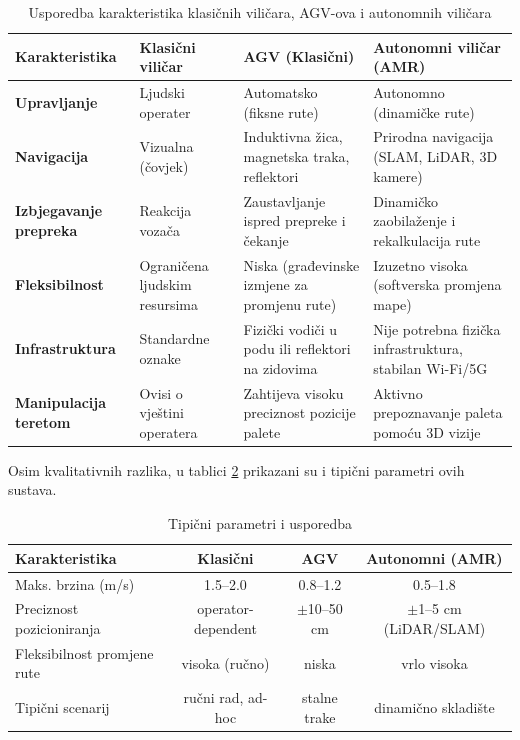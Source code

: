 \begin{table}[h]
\centering
\caption{Usporedba karakteristika klasičnih viličara, AGV-ova i autonomnih viličara}
\label{tab:usporedba}
\begin{tabularx}{\textwidth}{|l|X|X|X|}
\hline
\textbf{Karakteristika} & \textbf{Klasični viličar} & \textbf{AGV (Klasični)} & \textbf{Autonomni viličar (AMR)} \\ \hline
\textbf{Upravljanje} & Ljudski operater & Automatsko (fiksne rute) & Autonomno (dinamičke rute) \\ \hline
\textbf{Navigacija} & Vizualna (čovjek) & Induktivna žica, magnetska traka, reflektori & Prirodna navigacija (SLAM, LiDAR, 3D kamere) \\ \hline
\textbf{Izbjegavanje prepreka} & Reakcija vozača & Zaustavljanje ispred prepreke i čekanje & Dinamičko zaobilaženje i rekalkulacija rute \\ \hline
\textbf{Fleksibilnost} & Ograničena ljudskim resursima & Niska (građevinske izmjene za promjenu rute) & Izuzetno visoka (softverska promjena mape) \\ \hline
\textbf{Infrastruktura} & Standardne oznake & Fizički vodiči u podu ili reflektori na zidovima & Nije potrebna fizička infrastruktura, stabilan Wi-Fi/5G \\ \hline
\textbf{Manipulacija teretom} & Ovisi o vještini operatera & Zahtijeva visoku preciznost pozicije palete & Aktivno prepoznavanje paleta pomoću 3D vizije \\ \hline
\end{tabularx}
\end{table}

Osim kvalitativnih razlika, u tablici \ref{tab:params} prikazani su i tipični parametri ovih sustava.

\begin{table}[h]
\centering
\caption{Tipični parametri i usporedba}
\begin{tabular}{lccc}
\hline
Karakteristika & Klasični & AGV & Autonomni (AMR) \\
\hline
Maks. brzina (m/s) & 1.5--2.0 & 0.8--1.2 & 0.5--1.8 \\
Preciznost pozicioniranja & operator-dependent & $\pm$10--50 cm & $\pm$1--5 cm (LiDAR/SLAM) \\
Fleksibilnost promjene rute & visoka (ručno) & niska & vrlo visoka \\
Tipični scenarij & ručni rad, ad-hoc & stalne trake & dinamično skladište \\
\hline
\end{tabular}
\label{tab:params}
\end{table}
